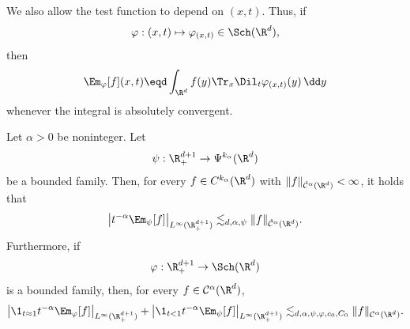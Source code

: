 \begin{remark}\label{rmk:variable-wavelets}
  We also allow the test function to depend on \((x, t)\). Thus, if
  \[
    \varphi : (x, t) \mapsto \varphi_{(x, t)} \in \Sch(\R^d),
  \]
  then
  \begin{equation}
    \label{eq:wavelet-coefficient-family}
    \Em_{\varphi}[f](x, t)
    \eqd
    \int_{\R^d}
    f(y) \Tr_x \Dil_t \varphi_{(x, t)}(y) \, \dd y
  \end{equation}
  whenever the integral is absolutely convergent.
\end{remark}

\begin{proposition}
  \label{prop:holder-analysis}
  Let \(\alpha > 0\) be noninteger. Let
  \[
    \psi : \R^{d + 1}_+ \to \Psi^{k_{\alpha}}(\R^d)
  \]
  be a bounded family. Then, for every
  \(f \in C^{k_{\alpha}}(\R^d)\) with
  \(\|f\|_{\dot{\mathcal{C}}^{\alpha}(\R^d)} < \infty\), it holds that
  \begin{equation}
    \label{eq:holder-analysis-homogeneous}
    \left|t^{-\alpha}\Em_{\psi}[f]\right|_{L^{\infty}(\R^{d + 1}_+)}
    \lesssim_{d, \alpha, \psi}
    \|f\|_{\dot{\mathcal{C}}^{\alpha}(\R^d)}.
  \end{equation}
  Furthermore, if
  \[
    \varphi : \R^{d + 1}_+ \to \Sch(\R^d)
  \]
  is a bounded family, then, for every \(f \in \mathcal{C}^{\alpha}(\R^d)\),
  \begin{equation}
    \label{eq:holder-analysis-nonhomogeneous}
    \left| \1_{t \approx 1} t^{-\alpha}\Em_{\varphi}[f]
    \right|_{L^{\infty}(\R^{d + 1}_+)}
    +
    \left| \1_{t < 1} t^{-\alpha}\Em_{\psi}[f]
    \right|_{L^{\infty}(\R^{d + 1}_+)}
    \lesssim_{d, \alpha, \psi, \varphi, c_0, C_0}
    \|f\|_{\mathcal{C}^{\alpha}(\R^d)}.
  \end{equation}
\end{proposition}

